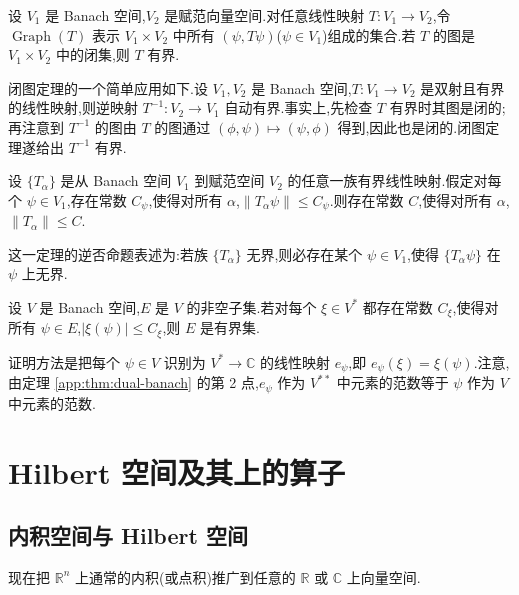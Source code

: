 \begin{theorem}[闭图定理]\label{app:thm:closed-graph}
设 \(V_1\) 是 Banach 空间,\(V_2\) 是赋范向量空间.对任意线性映射 \(T:V_1\to V_2\),令 \(\operatorname{Graph}(T)\) 表示 \(V_1\times V_2\) 中所有 \((\psi,T\psi)\)(\(\psi\in V_1\))组成的集合.若 \(T\) 的图是 \(V_1\times V_2\) 中的闭集,则 \(T\) 有界.
\end{theorem}

闭图定理的一个简单应用如下.设 \(V_1,V_2\) 是 Banach 空间,\(T:V_1\to V_2\) 是双射且有界的线性映射,则逆映射 \(T^{-1}:V_2\to V_1\) 自动有界.事实上,先检查 \(T\) 有界时其图是闭的;再注意到 \(T^{-1}\) 的图由 \(T\) 的图通过 \((\phi,\psi)\mapsto(\psi,\phi)\) 得到,因此也是闭的.闭图定理遂给出 \(T^{-1}\) 有界.

\begin{theorem}[一致有界原理]\label{app:thm:uniform-boundedness}
设 \(\{T_\alpha\}\) 是从 Banach 空间 \(V_1\) 到赋范空间 \(V_2\) 的任意一族有界线性映射.假定对每个 \(\psi\in V_1\),存在常数 \(C_\psi\),使得对所有 \(\alpha\),\(\|T_\alpha\psi\|\le C_\psi\).则存在常数 \(C\),使得对所有 \(\alpha\),\(\|T_\alpha\|\le C\).
\end{theorem}

这一定理的逆否命题表述为:若族 \(\{T_\alpha\}\) 无界,则必存在某个 \(\psi\in V_1\),使得 \(\{T_\alpha\psi\}\) 在 \(\psi\) 上无界.

\begin{corollary}\label{app:cor:bounded-set-dual}
设 \(V\) 是 Banach 空间,\(E\) 是 \(V\) 的非空子集.若对每个 \(\xi\in V^*\) 都存在常数 \(C_\xi\),使得对所有 \(\psi\in E\),\(|\xi(\psi)|\le C_\xi\),则 \(E\) 是有界集.
\end{corollary}

证明方法是把每个 \(\psi\in V\) 识别为 \(V^*\to\mathbb C\) 的线性映射 \(e_\psi\),即 \(e_\psi(\xi)=\xi(\psi)\).注意,由定理 \ref{app:thm:dual-banach} 的第 2 点,\(e_\psi\) 作为 \(V^{**}\) 中元素的范数等于 \(\psi\) 作为 \(V\) 中元素的范数.

\section{Hilbert 空间及其上的算子}

\subsection{内积空间与 Hilbert 空间}\label{app:subsec:hilbert}

现在把 \(\mathbb R^n\) 上通常的内积(或点积)推广到任意的 \(\mathbb R\) 或 \(\mathbb C\) 上向量空间.

